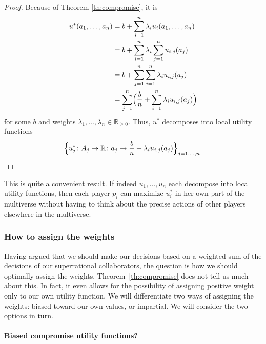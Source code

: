 \begin{proof}
Because of Theorem \ref{th:compromise}, it is 
\begin{equation*}
    \begin{split}
        u^{*}(a_{1},\dotsc,a_{n}) &= b + \sum_{i=1}^n\lambda_{i}u_{i}(a_{1},\dotsc,a_{n}) \\
                               &= b + \sum_{i=1}^n\lambda_{i}\sum_{j=1}^nu_{i,j}(a_{j}) \\
                               &= b + \sum_{j=1}^n\sum_{i=1}^n\lambda_{i}u_{i,j}(a_{j}) \\
                               &= \sum_{j=1}^n\Bigl(\frac{b}{n} +
                               \sum_{i=1}^n\lambda_{i}u_{i,j}(a_{j})\Bigr)\\
    \end{split}
\end{equation*}
for some \(b\) and weights \(\lambda_{1},\dotsc,\lambda_{n}
\in \mathbb{R}_{\geq 0}\). Thus, \(u^{*}\) decomposes into local utility functions
\begin{equation*}
\Bigl\{u_j^*\colon A_j \rightarrow \mathbb{R}\colon a_j \rightarrow \frac{b}{n} + \lambda_i
u_{i,j}(a_{j})\Bigr\}_{j = 1,\dotsc,n}.
\end{equation*}
\end{proof}
This is quite a convenient result. If indeed \(u_{1},\dotsc,u_{n}\) each
decompose into local utility functions, then each player \(p_{i}\) can
maximize \(u_{i}^{*}\) in her own part of the multiverse without having
to think about the precise actions of other players elsewhere in the
multiverse.

\hypertarget{how-to-assign-the-weights}{\subsubsection{How to assign the
weights}\label{how-to-assign-the-weights}}

Having argued that we should make our decisions based on a weighted sum
of the decisions of our superrational collaborators, the question is how
we should optimally assign the weights. Theorem~\ref{th:compromise} does not tell us much
about this. In fact, it even allows for the possibility of assigning
positive weight only to our own utility function. We will differentiate
two ways of assigning the weights: biased toward our own values, or
impartial. We will consider the two options in turn.

\paragraph{Biased compromise utility
functions?}\label{biased-compromise-utility-functions}

